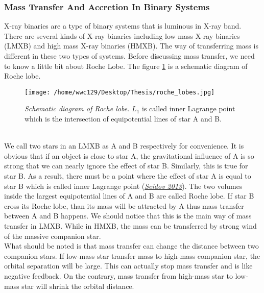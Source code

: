\documentclass[12pt]{report}
\begin{document}
            \subsubsection{Mass Transfer And Accretion In Binary Systems}
                X-ray binaries are a type of binary systems that is luminous in X-ray band. There are several kinds 
                of X-ray binaries including low mass X-ray binaries (LMXB) and high mass X-ray binaries (HMXB). 
                The way of transferring mass is different in these two types of systems. Before discussing mass 
                transfer, we need to know a little bit about Roche Lobe. The figure \ref{fig:roche lobe} is a 
                schematic diagram of Roche lobe.
                \begin{figure}[h]
                  \centering
                  \texttt{[image: /home/wwc129/Desktop/Thesis/roche\_lobes.jpg]}
                  \begin{minipage}{0.8\textwidth}
                  \caption{\footnotesize \textit{Schematic diagram of Roche lobe.} $L_{1}$ is called inner 
                            Lagrange point which is the intersection of equipotential lines of star A 
                            and B.}
                  \label{fig:roche lobe}
                  \end{minipage}
                \end{figure}\\
                \indent  We call two stars in an LMXB as A and B respectively for convenience. It is obvious 
                that if an object is close to star A, the gravitational influence of A is so strong that we can 
                nearly ignore the effect of star B. Similarly, this is true for star B. As a result, there must be 
                a point where the effect of star A is equal to star B which is called inner Lagrange point 
                \hypersetup{urlcolor= red}
                (\href{https://arxiv.org/pdf/astro-ph/0311272.pdf}{\textit{Seidov 2013}}). The two
                volumes inside the largest equipotential lines of A and B are called Roche lobe. If star B cross 
                its Roche lobe, than its mass will be attracted by A thus mass transfer between A and B happens. We 
                should notice that this is the main way of mass transfer in LMXB. While in HMXB, the mass can be 
                transferred by strong wind of the massive companion star. \\
                \indent 
                What should be noted is that mass transfer can change the distance between two companion stars. If 
                low-mass star transfer mass to high-mass companion star, the orbital separation will be large. 
                This can actually stop mass transfer and is like negative feedback. 
                On the contrary, mass transfer from high-mass star to low-mass star will shrink the orbital 
                distance.\\
                
\end{document}
